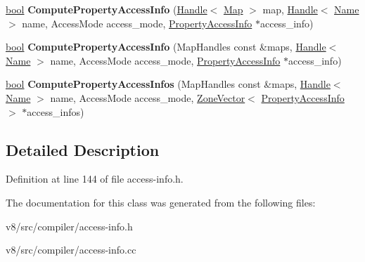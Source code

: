 \begin{DoxyCompactItemize}
\item 
\mbox{\label{classv8_1_1internal_1_1compiler_1_1AccessInfoFactory_a099ee7c7da8ee81a875f4f5570cdfbae}} 
\mbox{\hyperlink{classbool}{bool}} {\bfseries Compute\+Property\+Access\+Info} (\mbox{\hyperlink{classv8_1_1internal_1_1Handle}{Handle}}$<$ \mbox{\hyperlink{classv8_1_1internal_1_1Map}{Map}} $>$ map, \mbox{\hyperlink{classv8_1_1internal_1_1Handle}{Handle}}$<$ \mbox{\hyperlink{classv8_1_1internal_1_1Name}{Name}} $>$ name, Access\+Mode access\+\_\+mode, \mbox{\hyperlink{classv8_1_1internal_1_1compiler_1_1PropertyAccessInfo}{Property\+Access\+Info}} $\ast$access\+\_\+info)
\item 
\mbox{\label{classv8_1_1internal_1_1compiler_1_1AccessInfoFactory_a139d76ff3de09e3284150e34ee3fe417}} 
\mbox{\hyperlink{classbool}{bool}} {\bfseries Compute\+Property\+Access\+Info} (Map\+Handles const \&maps, \mbox{\hyperlink{classv8_1_1internal_1_1Handle}{Handle}}$<$ \mbox{\hyperlink{classv8_1_1internal_1_1Name}{Name}} $>$ name, Access\+Mode access\+\_\+mode, \mbox{\hyperlink{classv8_1_1internal_1_1compiler_1_1PropertyAccessInfo}{Property\+Access\+Info}} $\ast$access\+\_\+info)
\item 
\mbox{\label{classv8_1_1internal_1_1compiler_1_1AccessInfoFactory_a6745222d7b14597455235c014d31f491}} 
\mbox{\hyperlink{classbool}{bool}} {\bfseries Compute\+Property\+Access\+Infos} (Map\+Handles const \&maps, \mbox{\hyperlink{classv8_1_1internal_1_1Handle}{Handle}}$<$ \mbox{\hyperlink{classv8_1_1internal_1_1Name}{Name}} $>$ name, Access\+Mode access\+\_\+mode, \mbox{\hyperlink{classv8_1_1internal_1_1ZoneVector}{Zone\+Vector}}$<$ \mbox{\hyperlink{classv8_1_1internal_1_1compiler_1_1PropertyAccessInfo}{Property\+Access\+Info}} $>$ $\ast$access\+\_\+infos)
\end{DoxyCompactItemize}


\subsection{Detailed Description}


Definition at line 144 of file access-\/info.\+h.



The documentation for this class was generated from the following files\+:\begin{DoxyCompactItemize}
\item 
v8/src/compiler/access-\/info.\+h\item 
v8/src/compiler/access-\/info.\+cc\end{DoxyCompactItemize}
